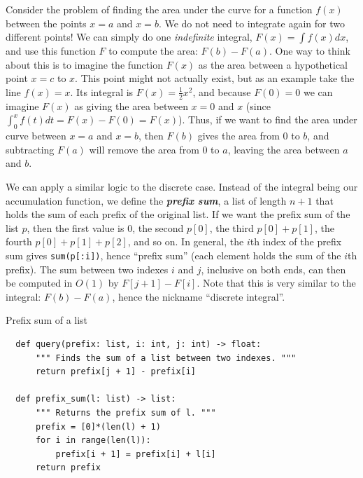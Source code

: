 \documentclass[11pt, oneside]{article}
\newcommand{\emphasis}[1]{\textbf{\textit{#1}}}
\theoremstyle{plain}
\theoremstyle{definition}
\begin{document}
Consider the problem of finding the area under the curve for a function
\( f(x) \) between the points \( x = a \) and \( x = b \). We do not
need to integrate again for two different points! We can simply do
one \textit{indefinite} integral, \( F(x) = \int f(x) dx \), and use
this function \( F \) to compute the area: \( F(b) - F(a) \). One way
to think about this is to imagine the function \( F(x) \) as the area
between a hypothetical point \( x = c \) to \( x \). This point might
not actually exist, but as an example take the line \( f(x) = x \).
Its integral is \( F(x) = \frac{1}{2} x^2 \), and because \( F(0) = 0 \)
we can imagine \( F(x) \) as giving the area between \( x = 0 \) and \( x \)
(since \( \int^x_0 f(t) dt = F(x) - F(0) = F(x) \)). Thus, if we want
to find the area under curve between \( x = a \) and \( x = b \),
then \( F(b) \) gives the area from 0 to \( b \), and subtracting
\( F(a) \) will remove the area from 0 to \( a \), leaving the area
between \( a \) and \( b \).

We can apply a similar logic to the discrete case. Instead of the integral
being our accumulation function, we define the \emphasis{prefix sum}, a list
of length \( n + 1 \) that holds the sum of each prefix of the original list.
If we want the prefix sum of the list \( p \), then the first value is 0, the
second \( p[0] \), the third \( p[0] + p[1] \), the fourth \( p[0] + p[1] +
p[2] \), and so on. In general, the \( i \)th index of the prefix sum gives
\texttt{sum(p[:i])}, hence \enquote{prefix sum} (each element
holds the sum of the \( i \)th prefix). The sum between two indexes \( i \)
and \( j \), inclusive on both ends, can then be computed in \( O(1) \) by
\( F[j + 1] - F[i] \). Note that this is very similar to the integral:
\( F(b) - F(a) \), hence the nickname \enquote{discrete integral}.
\begin{algorithm}[H]
  \caption{Prefix sum of a list}
  \setlength{\partopsep}{-\topsep} %
  \begin{verbatim}
  def query(prefix: list, i: int, j: int) -> float:
      """ Finds the sum of a list between two indexes. """
      return prefix[j + 1] - prefix[i]

  def prefix_sum(l: list) -> list:
      """ Returns the prefix sum of l. """
      prefix = [0]*(len(l) + 1)
      for i in range(len(l)):
          prefix[i + 1] = prefix[i] + l[i]
      return prefix
  \end{verbatim}
\end{algorithm}
\end{document}
